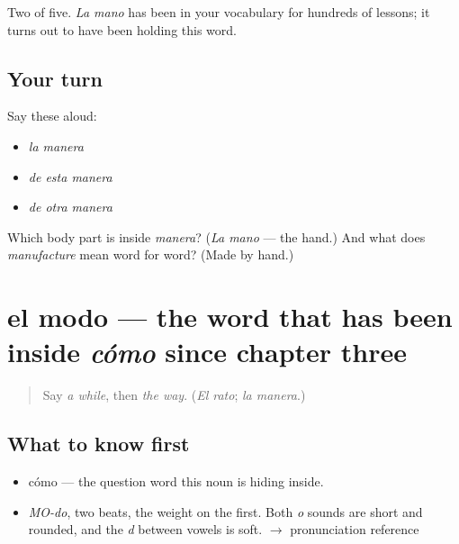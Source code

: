 \begin{grammarlens}[title={What you've built}]
Two of five. \emph{La mano} has been in your vocabulary for hundreds of lessons; it turns out to have been holding this word.
\end{grammarlens}

\subsection*{Your turn}
Say these aloud:

\begin{itemize}
\raggedright
  \item \emph{la manera}
  \item \emph{de esta manera}
  \item \emph{de otra manera}
\end{itemize}

\begin{tcolorbox}[breakable,colback=teal!4,colframe=teal!35!black,title={Before you move on}]
Which body part is inside \emph{manera}? (\emph{La mano} — the hand.) And what does \emph{manufacture} mean word for word? (Made by hand.)
\end{tcolorbox}
\section[el modo]{el modo — the word that has been inside \emph{cómo} since chapter three}

\label{lesson:ES-C331-modo}



\begin{quote}
Say \emph{a while}, then \emph{the way}. (\emph{El rato}; \emph{la manera}.)
\end{quote}

\subsection*{What to know first}
\begin{itemize}
\raggedright
  \item cómo — the question word this noun is hiding inside.
\end{itemize}

\begin{sounds}
\begin{itemize}
\raggedright
  \item \emph{MO-do}, two beats, the weight on the first. Both \emph{o} sounds are short and rounded, and the \emph{d} between vowels is soft. $\to$ pronunciation reference
\end{itemize}
\end{sounds}

